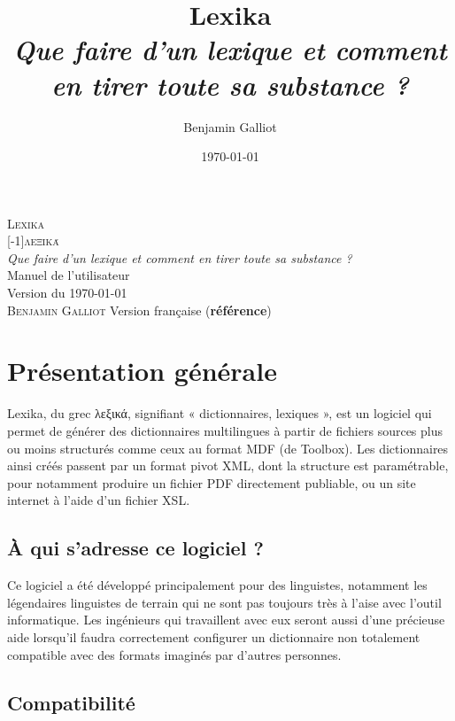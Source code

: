 \documentclass[10pt]{report}
\author{Benjamin Galliot}
\date{\today}
\title{{\Huge Lexika\\\Large\textit{Que faire d’un lexique et comment en tirer toute sa substance ?\bigskip }}}
\begin{document}
\begin{titlepage}
\begin{center}
    \vspace*{\fill}
    {\fontsize{5cm}{5.5cm}\textsc{Lexika}
    \\
    \scalebox{1}[-1]{{\textsc{\textcolor{black!50!white}{λεξικά}}}}}
    \\[1cm]
    \Huge\textit{Que faire d’un lexique et comment en tirer toute sa substance ?}
    \\[3cm]
    \Large Manuel de l’utilisateur
    \\[3cm]
    Version du \today
    \vspace*{\fill}
    \\
    \textsc{Benjamin Galliot}
    \hfill
    Version française (\textbf{référence})
    
\end{center}
    
\end{titlepage}

\tableofcontents

\chapter{Présentation générale}

Lexika, du grec λεξικά, signifiant « dictionnaires, lexiques », est un logiciel qui permet de générer des dictionnaires multilingues à partir de fichiers sources plus ou moins structurés comme ceux au format MDF (de Toolbox). Les dictionnaires ainsi créés passent par un format pivot XML, dont la structure est paramétrable, pour notamment produire un fichier PDF directement publiable, ou un site internet à l’aide d’un fichier XSL.

\section{À qui s’adresse ce logiciel ?}

Ce logiciel a été développé principalement pour des linguistes, notamment les légendaires linguistes de terrain qui ne sont pas toujours très à l’aise avec l’outil informatique. Les ingénieurs qui travaillent avec eux seront aussi d’une précieuse aide lorsqu’il faudra correctement configurer un dictionnaire non totalement compatible avec des formats imaginés par d’autres personnes.

\section{Compatibilité}
\end{document}
